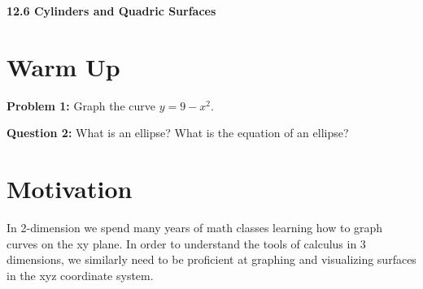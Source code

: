 \documentclass[11pt]{article}
\newcommand{\vs}{\vspace*{.1in}}
\begin{document}
\begin{LARGE}\begin{center}\bf 12.6 Cylinders and Quadric Surfaces \end{center}
\end{LARGE}

\vs\vs



\section{Warm Up}
\textbf{Problem 1:} Graph the curve $y = 9-x^2$.

\textbf{Question 2:} What is an ellipse? What is the equation of an ellipse?



\section{Motivation}
    In 2-dimension we spend many years of math classes learning how to graph curves on the xy plane. In order to understand the tools of calculus in 3 dimensions, we similarly need to be proficient at graphing and visualizing surfaces in the xyz coordinate system.
\end{document}
